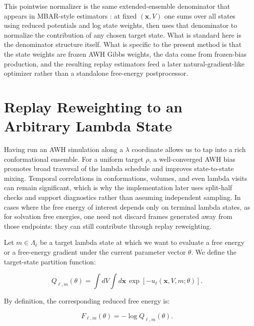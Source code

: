 This pointwise normalizer is the same extended-ensemble denominator that appears in MBAR-style estimators \citep{bennett1976bar,shirts2008mbar}: at fixed $(\mathbf{x}, V)$ one sums over all states using reduced potentials and log state weights, then uses that denominator to normalize the contribution of any chosen target state. What is standard here is the denominator structure itself. What is specific to the present method is that the state weights are frozen AWH Gibbs weights, the data come from frozen-bias production, and the resulting replay estimators feed a later natural-gradient-like optimizer rather than a standalone free-energy postprocessor.

\section{Replay Reweighting to an Arbitrary Lambda State}

Having run an AWH simulation along a $\lambda$ coordinate allows us to tap into a rich conformational ensemble. For a uniform target $\rho$, a well-converged AWH bias promotes broad traversal of the lambda schedule and improves state-to-state mixing. Temporal correlations in conformations, volumes, and even lambda visits can remain significant, which is why the implementation later uses split-half checks and support diagnostics rather than assuming independent sampling. In cases where the free energy of interest depends only on terminal lambda states, as for solvation free energies, one need not discard frames generated away from those endpoints: they can still contribute through replay reweighting.

Let $m \in \Lambda_\ell$ be a target lambda state at which we want to evaluate a free energy or a free-energy gradient under the current parameter vector $\theta$. We define the target-state partition function:

\begin{equation}
    Q_{\ell,m}(\theta)
    =
    \int dV \int d\mathbf{x} \,
    \exp \left[
        -u_\ell(\mathbf{x}, V, m; \theta)
    \right].
    \label{eq:qtarget}
\end{equation}

By definition, the corresponding reduced free energy is:

\begin{equation}
    F_{\ell,m}(\theta)
    =
    -\log Q_{\ell,m}(\theta).
    \label{eq:ftarget}
\end{equation}

